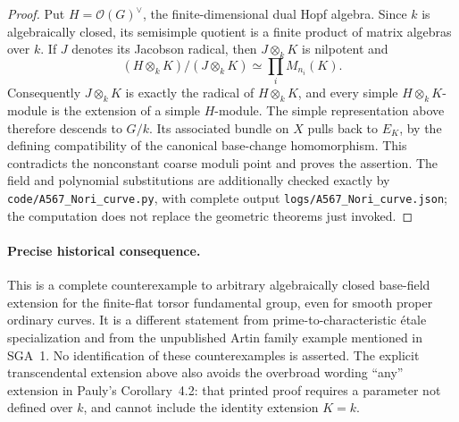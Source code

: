 \begin{proof}
Put $H=\mathcal O(G)^\vee$, the finite-dimensional dual Hopf
algebra.  Since $k$ is algebraically closed, its semisimple quotient
is a finite product of matrix algebras over $k$.  If $J$ denotes
its Jacobson radical, then $J\otimes_kK$ is nilpotent and
\[
 (H\otimes_kK)/(J\otimes_kK)
       \simeq\prod_i M_{n_i}(K).
\]
Consequently $J\otimes_kK$ is exactly the radical of
$H\otimes_kK$, and every simple $H\otimes_kK$-module is the
extension of a simple $H$-module.  The simple representation above
therefore descends to $G/k$.  Its associated bundle on $X$
pulls back to $E_K$, by the defining compatibility of the
canonical base-change homomorphism.  This contradicts the
nonconstant coarse moduli point and proves the assertion.
The field and polynomial substitutions are additionally checked
exactly by \texttt{code/A567\_Nori\_curve.py}, with complete output
\texttt{logs/A567\_Nori\_curve.json}; the computation does not
replace the geometric theorems just invoked.
\end{proof}

\paragraph{Precise historical consequence.}
This is a complete counterexample to arbitrary algebraically closed
base-field extension for the finite-flat torsor fundamental group,
even for smooth proper ordinary curves.  It is a different statement
from prime-to-characteristic \'etale specialization and from the
unpublished Artin family example mentioned in SGA~1.  No identification
of these counterexamples is asserted.  The explicit transcendental
extension above also avoids the overbroad wording ``any'' extension
in Pauly's Corollary~4.2: that printed proof requires a parameter
not defined over $k$, and cannot include the identity extension $K=k$.

